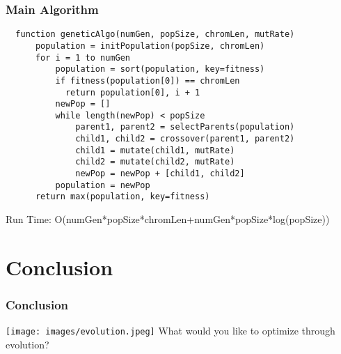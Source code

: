 \documentclass{beamer}
\begin{document}
\begin{frame}[fragile]
  \frametitle{Main Algorithm}
  \small
  \begin{verbatim}
  function geneticAlgo(numGen, popSize, chromLen, mutRate)
      population = initPopulation(popSize, chromLen)
      for i = 1 to numGen
          population = sort(population, key=fitness)
          if fitness(population[0]) == chromLen
            return population[0], i + 1
          newPop = []
          while length(newPop) < popSize
              parent1, parent2 = selectParents(population)
              child1, child2 = crossover(parent1, parent2)
              child1 = mutate(child1, mutRate)
              child2 = mutate(child2, mutRate)
              newPop = newPop + [child1, child2]
          population = newPop
      return max(population, key=fitness)
  \end{verbatim}
  Run Time: O(numGen*popSize*chromLen+numGen*popSize*log(popSize))
  \end{frame}

\section{Conclusion}

\begin{frame}
\frametitle{Conclusion}
\texttt{[image: images/evolution.jpeg]}
\centering
What would you like to optimize through evolution?
\end{frame}
\end{document}
